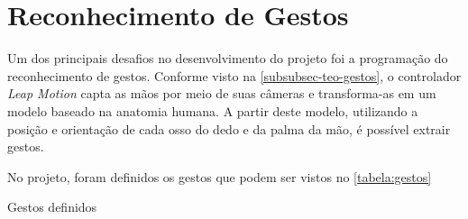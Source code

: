 \section{Reconhecimento de Gestos}\label{sec-desenvolvimento-gestos}

Um dos principais desafios no desenvolvimento do projeto foi a programação 
do reconhecimento de gestos. Conforme visto na 
\autoref{subsubsec-teo-gestos}, o controlador \textit{Leap Motion} 
capta as mãos por meio de suas câmeras e transforma-as em um modelo 
baseado na anatomia humana. A partir deste modelo, utilizando a posição 
e orientação de cada osso do dedo e da palma da mão, é possível extrair gestos. 

No projeto, foram definidos os gestos que podem ser vistos no \autoref{tabela:gestos}

\begin{quadro}[htb] \scriptsize
	\centering
	\caption[Gestos definidos]{Gestos definidos}
	

\end{quadro}

